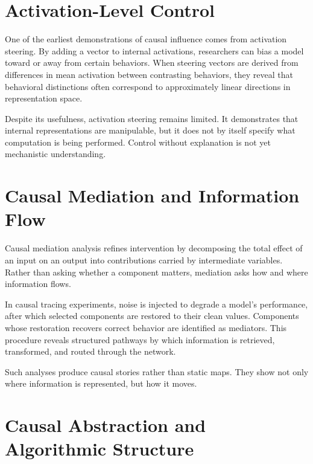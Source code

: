 \documentclass[11pt]{article}
\begin{document}
\section{Activation-Level Control}

One of the earliest demonstrations of causal influence comes from activation
steering. By adding a vector to internal activations, researchers can bias a
model toward or away from certain behaviors. When steering vectors are derived
from differences in mean activation between contrasting behaviors, they reveal
that behavioral distinctions often correspond to approximately linear
directions in representation space.

Despite its usefulness, activation steering remains limited. It demonstrates
that internal representations are manipulable, but it does not by itself specify
what computation is being performed. Control without explanation is not yet
mechanistic understanding.

\section{Causal Mediation and Information Flow}

Causal mediation analysis refines intervention by decomposing the total effect of
an input on an output into contributions carried by intermediate variables.
Rather than asking whether a component matters, mediation asks how and where
information flows.

In causal tracing experiments, noise is injected to degrade a model’s
performance, after which selected components are restored to their clean values.
Components whose restoration recovers correct behavior are identified as
mediators. This procedure reveals structured pathways by which information is
retrieved, transformed, and routed through the network.

Such analyses produce causal stories rather than static maps. They show not only
where information is represented, but how it moves.

\section{Causal Abstraction and Algorithmic Structure}
\end{document}
